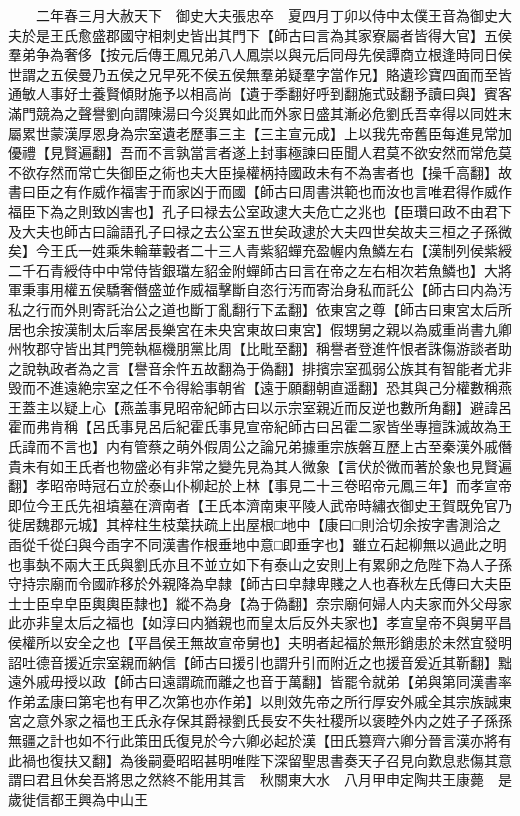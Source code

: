 　　二年春三月大赦天下　御史大夫張忠卒　夏四月丁卯以侍中太僕王音為御史大夫於是王氏愈盛郡國守相刺史皆出其門下【師古曰言為其家寮屬者皆得大官】五侯羣弟争為奢侈【按元后傳王鳳兄弟八人鳳崇以與元后同母先侯譚商立根逢時同日侯世謂之五侯曼乃五侯之兄早死不侯五侯無羣弟疑羣字當作兄】賂遺珍寶四面而至皆通敏人事好士養賢傾財施予以相高尚【遺于季翻好呼到翻施式䜴翻予讀曰與】賓客滿門競為之聲譽劉向謂陳湯曰今災異如此而外家日盛其漸必危劉氏吾幸得以同姓末屬累世蒙漢厚恩身為宗室遺老歷事三主【三主宣元成】上以我先帝舊臣每進見常加優禮【見賢遍翻】吾而不言孰當言者遂上封事極諫曰臣聞人君莫不欲安然而常危莫不欲存然而常亡失御臣之術也夫大臣操權柄持國政未有不為害者也【操千高翻】故書曰臣之有作威作福害于而家凶于而國【師古曰周書洪範也而汝也言唯君得作威作福臣下為之則致凶害也】孔子曰禄去公室政逮大夫危亡之兆也【臣瓚曰政不由君下及大夫也師古曰論語孔子曰禄之去公室五世矣政逮於大夫四世矣故夫三桓之子孫微矣】今王氏一姓乘朱輪華轂者二十三人青紫貂蟬充盈幄内魚鱗左右【漢制列侯紫綬二千石青綬侍中中常侍皆銀璫左貂金附蟬師古曰言在帝之左右相次若魚鱗也】大將軍秉事用權五侯驕奢僭盛並作威福擊斷自恣行汚而寄治身私而託公【師古曰内為汚私之行而外則寄託治公之道也斷丁亂翻行下孟翻】依東宮之尊【師古曰東宮太后所居也余按漢制太后率居長樂宮在未央宮東故曰東宮】假甥舅之親以為威重尚書九卿州牧郡守皆出其門筦執樞機朋黨比周【比毗至翻】稱譽者登進忤恨者誅傷游談者助之說執政者為之言【譽音余忤五故翻為于偽翻】排擯宗室孤弱公族其有智能者尤非毁而不進遠絶宗室之任不令得給事朝省【遠于願翻朝直遥翻】恐其與己分權數稱燕王蓋主以疑上心【燕盖事見昭帝紀師古曰以示宗室親近而反逆也數所角翻】避諱呂霍而弗肯稱【呂氏事見呂后紀霍氏事見宣帝紀師古曰呂霍二家皆坐專擅誅滅故為王氏諱而不言也】内有管蔡之萌外假周公之論兄弟據重宗族磐互歷上古至秦漢外戚僭貴未有如王氏者也物盛必有非常之變先見為其人微象【言伏於微而著於象也見賢遍翻】孝昭帝時冠石立於泰山仆柳起於上林【事見二十三卷昭帝元鳳三年】而孝宣帝即位今王氏先祖墳墓在濟南者【王氏本濟南東平陵人武帝時繡衣御史王賀既免官乃徙居魏郡元城】其梓柱生枝葉扶疏上出屋根□地中【康曰□則洽切余按字書測洽之臿從千從臼與今臿字不同漢書作根垂地中意□即垂字也】雖立石起柳無以過此之明也事埶不兩大王氏與劉氏亦且不並立如下有泰山之安則上有累卵之危陛下為人子孫守持宗廟而令國祚移於外親降為皁隸【師古曰皁隸卑賤之人也春秋左氏傳曰大夫臣士士臣皁皁臣輿輿臣隸也】縱不為身【為于偽翻】奈宗廟何婦人内夫家而外父母家此亦非皇太后之福也【如淳曰内猶親也而皇太后反外夫家也】孝宣皇帝不與舅平昌侯權所以安全之也【平昌侯王無故宣帝舅也】夫明者起福於無形銷患於未然宜發明詔吐德音援近宗室親而納信【師古曰援引也謂升引而附近之也援音爰近其靳翻】黜遠外戚毋授以政【師古曰遠謂疏而離之也音于萬翻】皆罷令就弟【弟與第同漢書率作弟孟康曰第宅也有甲乙次第也亦作弟】以則效先帝之所行厚安外戚全其宗族誠東宮之意外家之福也王氏永存保其爵禄劉氏長安不失社稷所以褒睦外内之姓子子孫孫無疆之計也如不行此策田氏復見於今六卿必起於漢【田氏篡齊六卿分晉言漢亦將有此禍也復扶又翻】為後嗣憂昭昭甚明唯陛下深留聖思書奏天子召見向歎息悲傷其意謂曰君且休矣吾將思之然終不能用其言　秋關東大水　八月甲申定陶共王康薨　是歲徙信都王興為中山王

